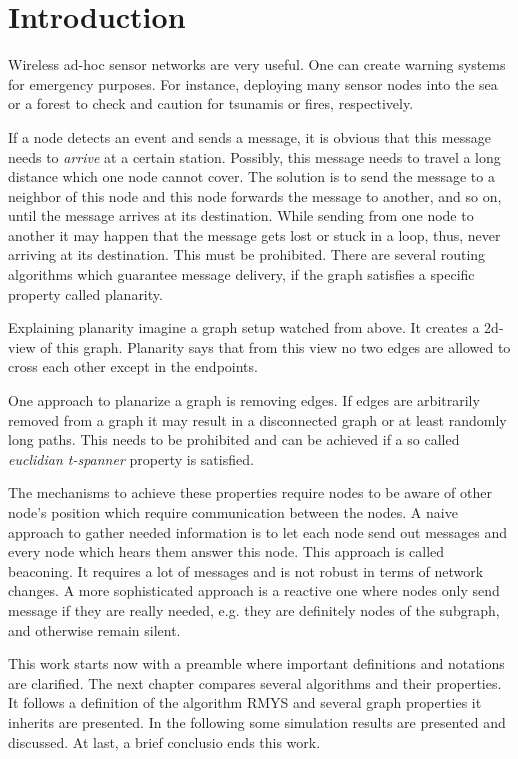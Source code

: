 \section{Introduction}
Wireless ad-hoc sensor networks are very useful. 
One can create warning systems for emergency purposes.
For instance, deploying many sensor nodes into the sea or a forest to check and caution for tsunamis or fires, respectively.

If a node detects an event and sends a message, it is obvious that this message needs to \emph{arrive} at a certain station.
Possibly, this message needs to travel a long distance which one node cannot cover.
The solution is to send the message to a neighbor of this node and this node forwards the message to another, and so on, until the message arrives at its destination.
While sending from one node to another it may happen that the message gets lost or stuck in a loop, thus, never arriving at its destination.
This must be prohibited.
There are several routing algorithms which guarantee message delivery, if the graph satisfies a specific property called planarity.

Explaining planarity imagine a graph setup watched from above. 
It creates a 2d-view of this graph.
Planarity says that from this view no two edges are allowed to cross each other except in the endpoints.

One approach to planarize a graph is removing edges.
If edges are arbitrarily removed from a graph it may result in a disconnected graph or at least randomly long paths.
This needs to be prohibited and can be achieved if a so called \emph{euclidian t-spanner} property is satisfied.

The mechanisms to achieve these properties require nodes to be aware of other node's position which require communication between the nodes.
A naive approach to gather needed information is to let each node send out messages and every node which hears them answer this node.
This approach is called beaconing.
It requires a lot of messages and is not robust in terms of network changes.
A more sophisticated approach is a reactive one where nodes only send message if they are really needed, e.g. they are definitely nodes of the subgraph, and otherwise remain silent. 

This work starts now with a preamble where important definitions and notations are clarified.
The next chapter compares several algorithms and their properties.
It follows a definition of the algorithm RMYS and several graph properties it inherits are presented.
In the following some simulation results are presented and discussed.
At last, a brief conclusio ends this work.